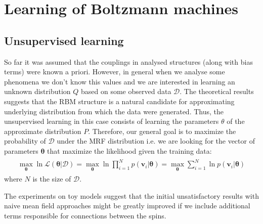 \chapter{Learning of Boltzmann machines}

\section{Unsupervised learning}
So far it was assumed that the couplings in analysed structures (along with bias terms) were known a priori. However, in general when we analyse some phenomena we don't know this values and we are interested in learning an unknown distribution $Q$ based on some observed data $\mathcal{D}$. The theoretical results suggests that the RBM structure is a natural candidate for approximating underlying distribution from which the data were generated. Thus, the unsupervised learning in this case consists of learning the parameters $\theta$ of the approximate distribution $P$. Therefore, our general goal is to maximize the probability of $\mathcal{D}$ under the MRF distribution i.e. we are looking for the vector of parameters $\mathbf{\theta}$ that maximize the likelihood given the training data:
\begin{align}
\begin{split}
\max_{\mathbf{\theta}} \ln \mathcal{L}(\mathbf{\theta}| \mathcal{D}) = \max_{\mathbf{\theta}}  \ln \prod_{i=1}^N p(\mathbf{v}_i |\mathbf{\theta}) = \max_{\mathbf{\theta}} \sum_{i=1}^N \ln p(\mathbf{v}_i |\mathbf{\theta} )
\end{split}
\end{align}
where $N$ is the size of $\mathcal{D}$. 

The experiments on toy models suggest that the initial unsatisfactory results with naive mean field approaches \cite{tieleman2008training} might be greatly improved if we include additional terms responsible for connections between the spins.

